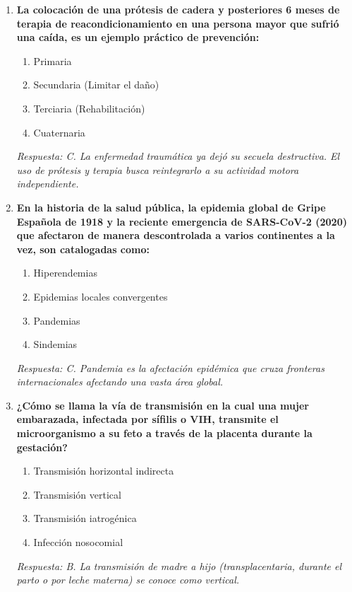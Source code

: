 \begin{enumerate}[label=\textbf{\arabic*.}]
    \item \textbf{La colocación de una prótesis de cadera y posteriores 6 meses de terapia de reacondicionamiento en una persona mayor que sufrió una caída, es un ejemplo práctico de prevención:}
    \begin{enumerate}
        \item[A)] Primaria
        \item[B)] Secundaria (Limitar el daño)
        \item[C)] Terciaria (Rehabilitación)
        \item[D)] Cuaternaria
    \end{enumerate}
    \textit{Respuesta: C. La enfermedad traumática ya dejó su secuela destructiva. El uso de prótesis y terapia busca reintegrarlo a su actividad motora independiente.}

    \item \textbf{En la historia de la salud pública, la epidemia global de Gripe Española de 1918 y la reciente emergencia de SARS-CoV-2 (2020) que afectaron de manera descontrolada a varios continentes a la vez, son catalogadas como:}
    \begin{enumerate}
        \item[A)] Hiperendemias
        \item[B)] Epidemias locales convergentes
        \item[C)] Pandemias
        \item[D)] Sindemias
    \end{enumerate}
    \textit{Respuesta: C. Pandemia es la afectación epidémica que cruza fronteras internacionales afectando una vasta área global.}

    \item \textbf{¿Cómo se llama la vía de transmisión en la cual una mujer embarazada, infectada por sífilis o VIH, transmite el microorganismo a su feto a través de la placenta durante la gestación?}
    \begin{enumerate}
        \item[A)] Transmisión horizontal indirecta
        \item[B)] Transmisión vertical
        \item[C)] Transmisión iatrogénica
        \item[D)] Infección nosocomial
    \end{enumerate}
    \textit{Respuesta: B. La transmisión de madre a hijo (transplacentaria, durante el parto o por leche materna) se conoce como vertical.}


\end{enumerate}
